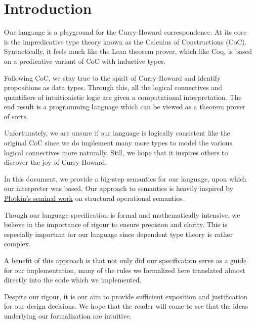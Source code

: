 \documentclass{article}
\begin{document}
\section{Introduction}
Our language is a playground for the Curry-Howard correspondence.
At its core is the impredicative type theory known as the Calculus of
Constructions (CoC). Syntactically, it feels much like the Lean theorem prover,
which like Coq, is based on a predicative variant of CoC with inductive types.

Following CoC, we stay true to the spirit of Curry-Howard and identify
propositions as data types.
Through this, all the logical connectives and quantifiers of intuitionistic
logic are given a computational interpretation.
The end result is a programming language which can be viewed as a theorem prover
of sorts.

Unfortunately, we are unsure if our language is logically consistent like the
original CoC since we do implement many more types to model the various logical
connectives more naturally. Still, we hope that it inspires others to discover
the joy of Curry-Howard.


In this document, we provide a big-step semantics for our language, upon which
our interpreter was based.
Our approach to semantics is heavily inspired by 
\href{https://homepages.inf.ed.ac.uk/gdp/publications/sos_jlap.pdf}
{Plotkin's seminal work} on structural operational semantics.

Though our language specification is formal and mathematically
intensive, we believe in the importance of rigour to ensure precision and clarity.
This is especially important for our language since dependent type theory is
rather complex.

A benefit of this approach is that not only did our specification serve as a
guide for our implementation, many of the rules we formalized here
translated almost directly into the code which we implemented.

Despite our rigour, it is our aim to provide sufficient exposition and
justification for our design decisions.
We hope that the reader will come to see that the ideas underlying our formalization
are intuitive. 
\end{document}

